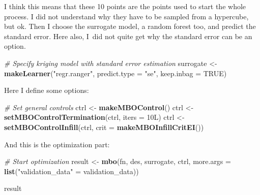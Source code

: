 \documentclass[]{gitbook}
\newenvironment{Shaded}{\begin{snugshade}}{\end{snugshade}}
\newcommand{\CommentTok}[1]{\textcolor[rgb]{0.56,0.35,0.01}{\textit{#1}}}
\newcommand{\DataTypeTok}[1]{\textcolor[rgb]{0.13,0.29,0.53}{#1}}
\newcommand{\KeywordTok}[1]{\textcolor[rgb]{0.13,0.29,0.53}{\textbf{#1}}}
\newcommand{\NormalTok}[1]{#1}
\newcommand{\OtherTok}[1]{\textcolor[rgb]{0.56,0.35,0.01}{#1}}
\newcommand{\StringTok}[1]{\textcolor[rgb]{0.31,0.60,0.02}{#1}}
\theoremstyle{definition}
\theoremstyle{definition}
\theoremstyle{definition}
\theoremstyle{remark}
\begin{document}
I think this means that these 10 points are the points used to start the
whole process. I did not understand why they have to be sampled from a
hypercube, but ok. Then I choose the surrogate model, a random forest
too, and predict the standard error. Here also, I~did not quite get why
the standard error can be an option.

\begin{Shaded}
\begin{Highlighting}[]
\CommentTok{# Specify kriging model with standard error estimation}
\NormalTok{surrogate <-}\StringTok{ }\KeywordTok{makeLearner}\NormalTok{(}\StringTok{"regr.ranger"}\NormalTok{, }\DataTypeTok{predict.type =} \StringTok{"se"}\NormalTok{, }\DataTypeTok{keep.inbag =} \OtherTok{TRUE}\NormalTok{)}
\end{Highlighting}
\end{Shaded}

Here I define some options:

\begin{Shaded}
\begin{Highlighting}[]
\CommentTok{# Set general controls}
\NormalTok{ctrl <-}\StringTok{ }\KeywordTok{makeMBOControl}\NormalTok{()}
\NormalTok{ctrl <-}\StringTok{ }\KeywordTok{setMBOControlTermination}\NormalTok{(ctrl, }\DataTypeTok{iters =}\NormalTok{ 10L)}
\NormalTok{ctrl <-}\StringTok{ }\KeywordTok{setMBOControlInfill}\NormalTok{(ctrl, }\DataTypeTok{crit =} \KeywordTok{makeMBOInfillCritEI}\NormalTok{())}
\end{Highlighting}
\end{Shaded}

And this is the optimization part:

\begin{Shaded}
\begin{Highlighting}[]
\CommentTok{# Start optimization}
\NormalTok{result <-}\StringTok{ }\KeywordTok{mbo}\NormalTok{(fn, des, surrogate, ctrl, }\DataTypeTok{more.args =} \KeywordTok{list}\NormalTok{(}\StringTok{"validation_data"}\NormalTok{ =}\StringTok{ }\NormalTok{validation_data))}
\end{Highlighting}
\end{Shaded}

\begin{Shaded}
\begin{Highlighting}[]
\NormalTok{result}
\end{Highlighting}
\end{Shaded}
\end{document}
